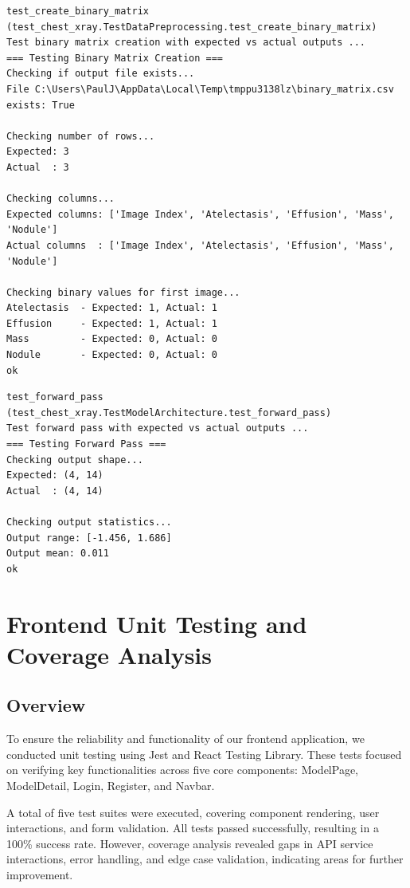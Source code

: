 \documentclass[12pt, titlepage]{article}
\begin{document}
\begin{verbatim}
test_create_binary_matrix (test_chest_xray.TestDataPreprocessing.test_create_binary_matrix)
Test binary matrix creation with expected vs actual outputs ...
=== Testing Binary Matrix Creation ===
Checking if output file exists...
File C:\Users\PaulJ\AppData\Local\Temp\tmppu3138lz\binary_matrix.csv exists: True

Checking number of rows...
Expected: 3
Actual  : 3

Checking columns...
Expected columns: ['Image Index', 'Atelectasis', 'Effusion', 'Mass', 'Nodule']
Actual columns  : ['Image Index', 'Atelectasis', 'Effusion', 'Mass', 'Nodule']

Checking binary values for first image...
Atelectasis  - Expected: 1, Actual: 1
Effusion     - Expected: 1, Actual: 1
Mass         - Expected: 0, Actual: 0
Nodule       - Expected: 0, Actual: 0
ok
\end{verbatim}

\begin{verbatim}
test_forward_pass (test_chest_xray.TestModelArchitecture.test_forward_pass)
Test forward pass with expected vs actual outputs ...
=== Testing Forward Pass ===
Checking output shape...
Expected: (4, 14)
Actual  : (4, 14)

Checking output statistics...
Output range: [-1.456, 1.686]
Output mean: 0.011
ok
\end{verbatim}

\section{Frontend Unit Testing and Coverage Analysis}

\subsection{Overview}

To ensure the reliability and functionality of our frontend application, we conducted unit testing using Jest and React Testing Library. These tests focused on verifying key functionalities across five core components: ModelPage, ModelDetail, Login, Register, and Navbar.

A total of five test suites were executed, covering component rendering, user interactions, and form validation. All tests passed successfully, resulting in a 100\% success rate. However, coverage analysis revealed gaps in API service interactions, error handling, and edge case validation, indicating areas for further improvement.
\end{document}
